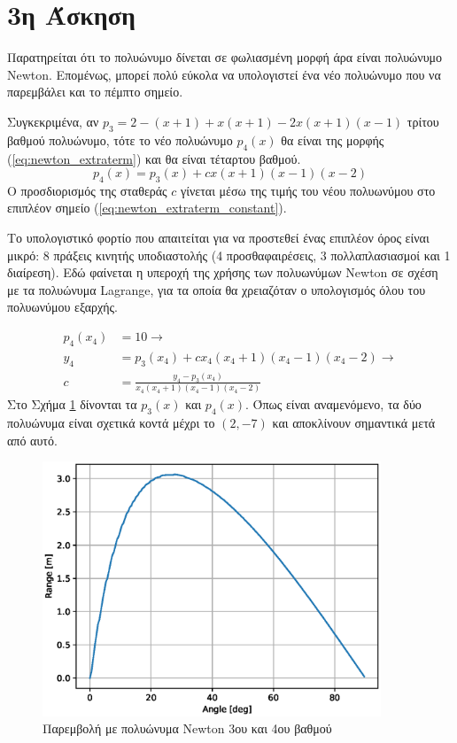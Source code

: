 \documentclass[assignment4.tex]{subfiles}
\begin{document}
\section*{3η Άσκηση}
Παρατηρείται ότι το πολυώνυμο δίνεται σε φωλιασμένη μορφή άρα είναι πολυώνυμο \textlatin{Newton}. Επομένως, μπορεί πολύ εύκολα να υπολογιστεί ένα νέο πολυώνυμο που να παρεμβάλει και το πέμπτο σημείο.

Συγκεκριμένα, αν $p_3=2-(x+1)+x(x+1)-2x(x+1)(x-1)$ τρίτου βαθμού πολυώνυμο, τότε το νέο πολυώνυμο $p_4(x)$ θα είναι της μορφής (\ref{eq:newton_extraterm}) και θα είναι τέταρτου βαθμού. 
\begin{equation}
p_4(x) = p_3(x) + cx(x+1)(x-1)(x-2)
\label{eq:newton_extraterm}
\end{equation}
Ο προσδιορισμός της σταθεράς $c$ γίνεται μέσω της τιμής του νέου πολυωνύμου στο επιπλέον σημείο (\ref{eq:newton_extraterm_constant}). 

Το υπολογιστικό φορτίο που απαιτείται για να προστεθεί ένας επιπλέον όρος είναι μικρό: 8 πράξεις κινητής υποδιαστολής (4 προσθαφαιρέσεις, 3 πολλαπλασιασμοί και 1 διαίρεση). Εδώ φαίνεται η υπεροχή της χρήσης των πολυωνύμων \textlatin{Newton} σε σχέση με τα πολυώνυμα \textlatin{Lagrange}, για τα οποία θα χρειαζόταν ο υπολογισμός όλου του πολυωνύμου εξαρχής.

\begin{equation}
\begin{split}
p_4(x_4) &= 10 \rightarrow \\
 y_4 &= p_3(x_4) + cx_4(x_4+1)(x_4-1)(x_4-2) \rightarrow \\
 c &= \frac{y_4-p_3(x_4)}{x_4(x_4+1)(x_4-1)(x_4-2)}
\end{split}
\label{eq:newton_extraterm_constant}
\end{equation}
Στο Σχήμα \ref{fig:ex3} δίνονται τα $p_3(x)$ και $p_4(x)$. Όπως είναι αναμενόμενο, τα δύο πολυώνυμα είναι σχετικά κοντά μέχρι το $(2,-7)$ και αποκλίνουν σημαντικά μετά από αυτό.

\begin{figure}[hp]
	\includegraphics[width=0.9\textwidth]{ex3a.eps}
	\centering
	\caption{Παρεμβολή με πολυώνυμα \textlatin{Newton} 3ου και 4ου βαθμού}
	\label{fig:ex3}
\end{figure}
\end{document}

